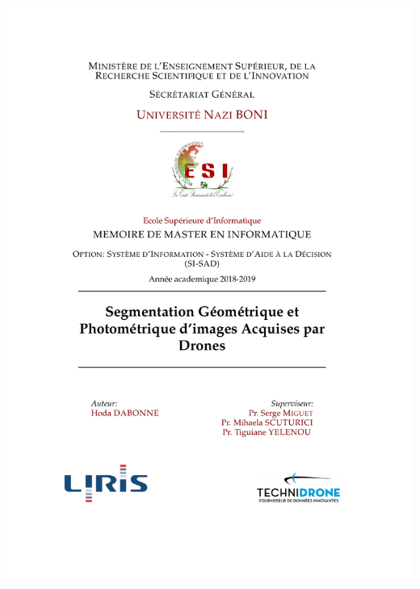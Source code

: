 
\addtocounter{page}{-1}
\thispagestyle{empty}
\begin{center}
\includegraphics[width=\textwidth]{miscpages/title.pdf}
\end{center}
\newpage
\thispagestyle{front}


